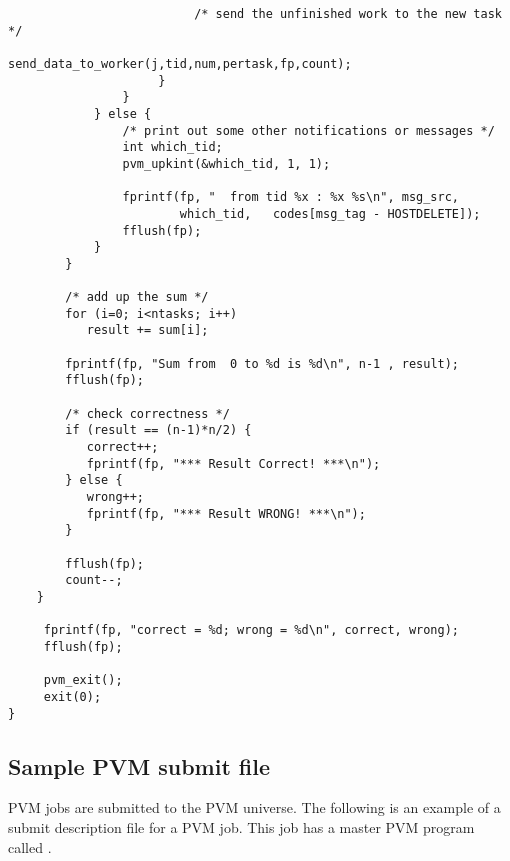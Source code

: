 \begin{verbatim}
                          /* send the unfinished work to the new task */
                          send_data_to_worker(j,tid,num,pertask,fp,count);
                     }
                }
            } else {
                /* print out some other notifications or messages */
                int which_tid;
                pvm_upkint(&which_tid, 1, 1);
        
                fprintf(fp, "  from tid %x : %x %s\n", msg_src,
                        which_tid,   codes[msg_tag - HOSTDELETE]);
                fflush(fp);
            }
        }        
      
        /* add up the sum */
        for (i=0; i<ntasks; i++)
           result += sum[i];
          
        fprintf(fp, "Sum from  0 to %d is %d\n", n-1 , result);
        fflush(fp);
          
        /* check correctness */
        if (result == (n-1)*n/2) {
           correct++;
           fprintf(fp, "*** Result Correct! ***\n");
        } else {
           wrong++;
           fprintf(fp, "*** Result WRONG! ***\n");
        }

        fflush(fp);
        count--;
    }
     
     fprintf(fp, "correct = %d; wrong = %d\n", correct, wrong);
     fflush(fp);

     pvm_exit();
     exit(0);
}

\end{verbatim}
\normalsize

\subsection{\label{sec:PVM-Submit}Sample PVM submit file}

PVM jobs are submitted to the PVM universe.
The following is an
example of a submit description file for a PVM job.  
This job has a master PVM program called .

